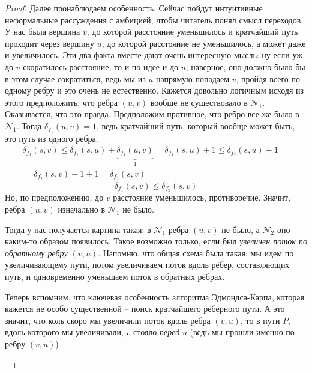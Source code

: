 \begin{proof}
    Далее пронаблюдаем особенность. Сейчас пойдут интуитивные неформальные рассуждения с амбицией, чтобы читатель понял смысл переходов. У нас была вершина $v$, до которой расстояние уменьшилось и кратчайший путь проходит через вершину $u$, до которой расстояние не уменьшилось, а может даже и увеличилось.
    Эти два факта вместе дают очень интересную мысль: ну если уж до $v$ скоратилось расстояние, то и по идее и до $u$, наверное, оно должно было бы в этом случае сократиться, ведь мы из $u$ напрямую попадаем $v$, пройдя всего по одному ребру и это очень не естественно.
    Кажется довольно логичным исходя из этого предположить, что ребра $(u, v)$ вообще не существовало в $\mathcal{N}_1$. Оказывается, что это правда. Предположим противное, что ребро все же было в $\mathcal{N}_1$. 
    Тогда $\delta_{f_1}(u, v) = 1$, ведь кратчайший путь, который вообще может быть, -- это путь из одного ребра.
    \begin{multline*}
        \delta_{f_1}(s, v) \leq \delta_{f_1}(s, u) + \underbrace{\delta_{f_1}(u, v)}_{1} = \delta_{f_1}(s, u) + 1 \leq \delta_{f_2}(s, u) + 1 = \\
         = \delta_{f_2}(s, v) - 1 + 1 = \delta_{f_2}(s, v)
    \end{multline*}
    \begin{equation*}
        \delta_{f_1}(s, v) \leq \delta_{f_2}(s, v)
    \end{equation*}
    Но, по предположению, до $v$ расстояние уменьшилось, противоречие. Значит, ребра $(u, v)$ изначально в $\mathcal{N}_1$ не было.

    Тогда у нас получается картина такая: в $\mathcal{N}_1$ ребра $(u, v)$ не было, а $\mathcal{N}_2$ оно каким-то образом появилось.
    Такое возможно только, если был \textit{увеличен поток по обратному ребру $(v, u)$}. 
    Напомню, что общая схема была такая: мы идем по увеличивающему пути, потом увеличиваем поток вдоль рёбер, составляющих путь, и одновременно уменьшаем поток в обратных рёбрах.
 
    Теперь вспомним, что ключевая особенность алгоритма Эдмондса-Карпа, которая кажется не особо существенной -- поиск кратчайшего рёберного пути.
    А это значит, что коль скоро мы увеличили поток вдоль ребра $(v, u)$, то в пути $P$, вдоль которого мы увеличивали, $v$ стояло \textit{перед} $u$ (ведь мы прошли именно по ребру $(v, u)$)

    \begin{figure}[h]
        \centering
\end{figure}
\end{proof}
